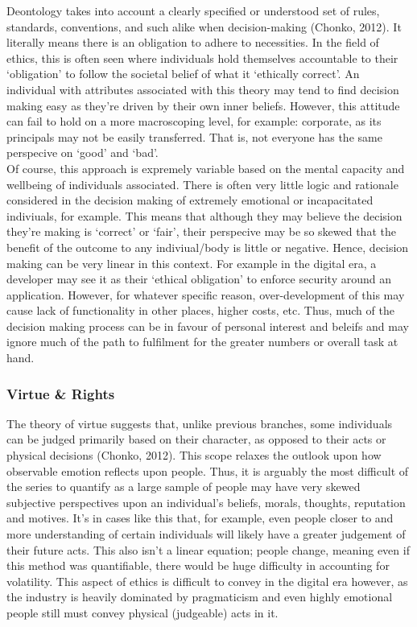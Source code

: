 \documentclass[11pt, english]{article}
\begin{document}
	Deontology takes into account a clearly specified or understood set of rules, standards, conventions, and such alike when decision-making (Chonko, 2012). It literally means there is an obligation to adhere to necessities. In the field of ethics, this is often seen where individuals hold themselves accountable to their `obligation' to follow the societal belief of what it `ethically correct'. An individual with attributes associated with this theory may tend to find decision making easy as they're driven by their own inner beliefs. However, this attitude can fail to hold on a more macroscoping level, for example: corporate, as its principals may not be easily transferred. That is, not everyone has the same perspecive on `good' and `bad'.\\

	Of course, this approach is expremely variable based on the mental capacity and wellbeing of individuals associated. There is often very little logic and rationale considered in the decision making of extremely emotional or incapacitated indiviuals, for example. This means that although they may believe the decision they're making is `correct' or `fair', their perspecive may be so skewed that the benefit of the outcome to any indiviual/body is little or negative. Hence, decision making can be very linear in this context. For example in the digital era, a developer may see it as their `ethical obligation' to enforce security around an application. However, for whatever specific reason, over-development of this may cause lack of functionality in other places, higher costs, etc. Thus, much of the decision making process can be in favour of personal interest and beleifs and may ignore much of the path to fulfilment for the greater numbers or overall task at hand.

		\subsubsection{Virtue \& Rights}

	The theory of virtue suggests that, unlike previous branches, some individuals can be judged primarily based on their character, as opposed to their acts or physical decisions (Chonko, 2012). This scope relaxes the outlook upon how observable emotion reflects upon people. Thus, it is arguably the most difficult of the series to quantify as a large sample of people may have very skewed subjective perspectives upon an individual's beliefs, morals, thoughts, reputation and motives. It's in cases like this that, for example, even people closer to and more understanding of certain individuals will likely have a greater judgement of their future acts. This also isn't a linear equation; people change, meaning even if this method was quantifiable, there would be huge difficulty in accounting for volatility. This aspect of ethics is difficult to convey in the digital era however, as the industry is heavily dominated by pragmaticism and even highly emotional people still must convey physical (judgeable) acts in it.\\
\end{document}
